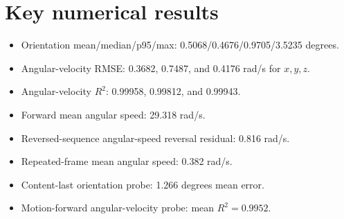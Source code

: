 \documentclass[11pt,a4paper]{article}
\begin{document}
\section{Key numerical results}
\begin{itemize}[leftmargin=*]
\item Orientation mean/median/p95/max: 0.5068/0.4676/0.9705/3.5235 degrees.
\item Angular-velocity RMSE: 0.3682, 0.7487, and 0.4176 rad/s for $x,y,z$.
\item Angular-velocity $R^2$: 0.99958, 0.99812, and 0.99943.
\item Forward mean angular speed: 29.318 rad/s.
\item Reversed-sequence angular-speed reversal residual: 0.816 rad/s.
\item Repeated-frame mean angular speed: 0.382 rad/s.
\item Content-last orientation probe: 1.266 degrees mean error.
\item Motion-forward angular-velocity probe: mean $R^2=0.9952$.
\end{itemize}



\end{document}
